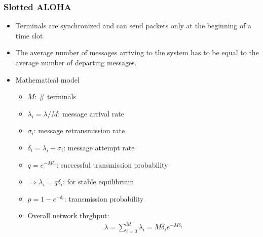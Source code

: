 \subsubsection{Slotted ALOHA}
\begin{itemize}
	\item Terminals are synchronized and can send packets only at the beginning of a time slot
	\item The average number of messages arriving to the system has to be equal to the average number of departing messages.
	\item Mathematical model
	\begin{itemize}
		\item $M$: \# terminals
		\item $\lambda_i = \lambda / M$: message arrival rate
		\item $\sigma_i$: message retransmission rate
		\item $\delta_i = \lambda_i + \sigma_i$: message attempt rate
		\item $q = e^{-M \delta_i}$: successful transmission probability
		\item $ \Rightarrow \lambda_i = q \delta_i$: for stable equilibrium
		\item $p = 1 - e^{-\delta_i}$: transmission probability
		\item Overall network thrghput:
		\begin{align*}
			\lambda = \sum_{i=0}^M \lambda_i = M \delta_i e^{-M \delta_i}
		\end{align*}
	\end{itemize}
\end{itemize}
